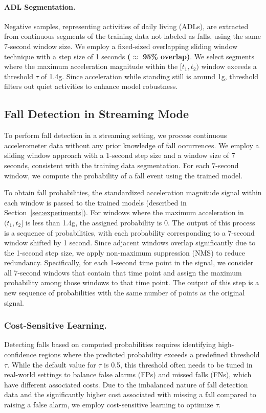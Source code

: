 \documentclass[runningheads]{llncs}
\begin{document}
\paragraph{ADL Segmentation.} Negative samples, representing activities of daily living (ADLs), are extracted from continuous segments of the training data not labeled as falls, using the same 7-second window size. We employ a fixed-sized overlapping sliding window technique with a step size of 1 seconds \textbf{($\approx$ 95\% overlap)}. We select segments where the maximum acceleration magnitude within the $[t_1, t_2)$ window exceeds a threshold $\tau$ of 1.4g. Since acceleration while standing still is around 1g, threshold filters out quiet activities to enhance model robustness.

\subsection{Fall Detection in Streaming Mode}
\label{sec:fall-detection}
To perform fall detection in a streaming setting, we process continuous accelerometer data without any prior knowledge of fall occurrences. We employ a sliding window approach with a 1-second step size and a window size of 7 seconds, consistent with the training data segmentation. For each 7-second window, we compute the probability of a fall event using the trained model.

To obtain fall probabilities, the standardized acceleration magnitude signal within each window is passed to the trained models (described in Section~\ref{sec:experiments}). For windows where the maximum acceleration in $(t_1, t_2]$ is less than 1.4g, the assigned probability is 0. The output of this process is a sequence of probabilities, with each probability corresponding to a 7-second window shifted by 1 second. Since adjacent windows overlap significantly due to the 1-second step size, we apply non-maximum suppression (NMS) to reduce redundancy. Specifically, for each 1-second time point in the signal, we consider all 7-second windows that contain that time point and assign the maximum probability among those windows to that time point. The output of this step is a new sequence of probabilities with the same number of points as the original signal.

\subsubsection{Cost-Sensitive Learning.}
\label{sec:cost-sensitive}
Detecting falls based on computed probabilities requires identifying high-confidence regions where the predicted probability exceeds a predefined threshold  $\tau$. While the default value for  $\tau$ is 0.5, this threshold often needs to be tuned in real-world settings to balance false alarms (FPs) and missed falls (FNs), which have different associated costs. Due to the imbalanced nature of fall detection data and the significantly higher cost associated with missing a fall compared to raising a false alarm, we employ cost-sensitive learning \cite{elkan2001foundations} to optimize  $\tau$.
\end{document}
